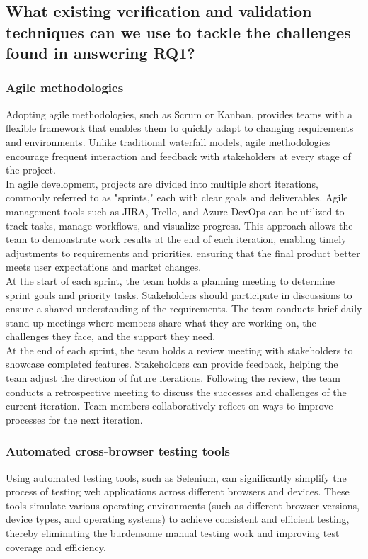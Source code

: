 \documentclass[a4paper, 11pt]{article}  %
\begin{document}
\subsection{What existing verification and validation techniques can we use to tackle the challenges found in answering RQ1?}
\subsubsection{Agile methodologies}
\vspace{0.25cm} %
Adopting agile methodologies, such as Scrum or Kanban, provides teams with a flexible framework that enables them to quickly adapt to changing requirements and environments. Unlike traditional waterfall models, agile methodologies encourage frequent interaction and feedback with stakeholders at every stage of the project\cite{clutterbuck2009case}.\\
In agile development, projects are divided into multiple short iterations, commonly referred to as "sprints," each with clear goals and deliverables. Agile management tools such as JIRA, Trello, and Azure DevOps can be utilized to track tasks, manage workflows, and visualize progress. This approach allows the team to demonstrate work results at the end of each iteration, enabling timely adjustments to requirements and priorities, ensuring that the final product better meets user expectations and market changes.\\
At the start of each sprint, the team holds a planning meeting to determine sprint goals and priority tasks. Stakeholders should participate in discussions to ensure a shared understanding of the requirements. The team conducts brief daily stand-up meetings where members share what they are working on, the challenges they face, and the support they need.\\
At the end of each sprint, the team holds a review meeting with stakeholders to showcase completed features. Stakeholders can provide feedback, helping the team adjust the direction of future iterations. Following the review, the team conducts a retrospective meeting to discuss the successes and challenges of the current iteration. \cite{ge2006agile}Team members collaboratively reflect on ways to improve processes for the next iteration.
\subsubsection{Automated cross-browser testing tools}
\vspace{0.25cm} %
Using automated testing tools, such as Selenium, can significantly simplify the process of testing web applications across different browsers and devices. These tools simulate various operating environments (such as different browser versions, device types, and operating systems) to achieve consistent and efficient testing, thereby eliminating the burdensome manual testing work and improving test coverage and efficiency.
\end{document}
